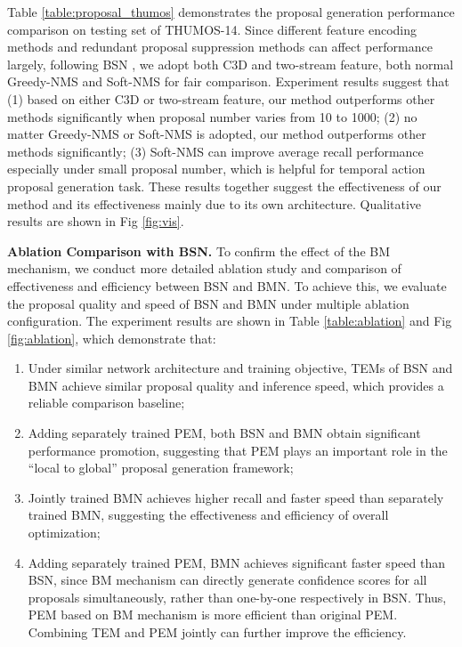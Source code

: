 \documentclass[10pt,twocolumn,letterpaper]{article}
\begin{document}
Table  \ref{table:proposal_thumos} demonstrates the proposal generation performance comparison on testing set of THUMOS-14. Since different feature encoding methods and redundant proposal suppression methods can affect performance largely, following BSN \cite{lin2018bsn}, we adopt both C3D and two-stream feature, both normal Greedy-NMS and Soft-NMS for fair comparison. 
Experiment results suggest that (1) based on either C3D or two-stream feature, our method outperforms other methods significantly when proposal number varies from 10 to 1000;
(2) no matter Greedy-NMS or Soft-NMS is adopted, our method outperforms other methods significantly; (3) Soft-NMS can improve  average recall performance especially under small proposal number, which is helpful for temporal action proposal generation task.
These results together suggest the effectiveness of our method and its effectiveness mainly due to its own architecture. Qualitative results are shown in Fig \ref{fig:vis}.

\noindent
\textbf{Ablation Comparison with BSN.}
To confirm the effect of the BM mechanism, we conduct more detailed ablation study and comparison of effectiveness and efficiency between BSN \cite{lin2018bsn} and BMN. To achieve this, we evaluate the proposal quality and speed of BSN and BMN under multiple ablation configuration.
The experiment results are shown in Table \ref{table:ablation} and Fig \ref{fig:ablation}, which demonstrate that:




\begin{enumerate}
\setlength{\itemsep}{0pt}
\setlength{\parsep}{0pt}
\setlength{\parskip}{0pt}
\item Under similar network architecture and training objective, TEMs of BSN and BMN achieve similar proposal quality  and inference speed, which provides a reliable comparison baseline;
\item Adding separately trained PEM, both BSN and BMN obtain significant performance promotion,  suggesting that PEM plays an important role in the ``local to global'' proposal generation framework;
\item Jointly trained BMN achieves higher recall and faster speed than separately trained BMN, suggesting the effectiveness and efficiency of overall optimization;
\item Adding separately trained PEM, BMN achieves significant faster speed than BSN, since BM mechanism can directly generate confidence scores for all proposals simultaneously, rather than one-by-one respectively in BSN. Thus, PEM based on BM mechanism is  more efficient than original PEM. Combining TEM and PEM jointly can further improve the efficiency.
\end{enumerate}
\end{document}
